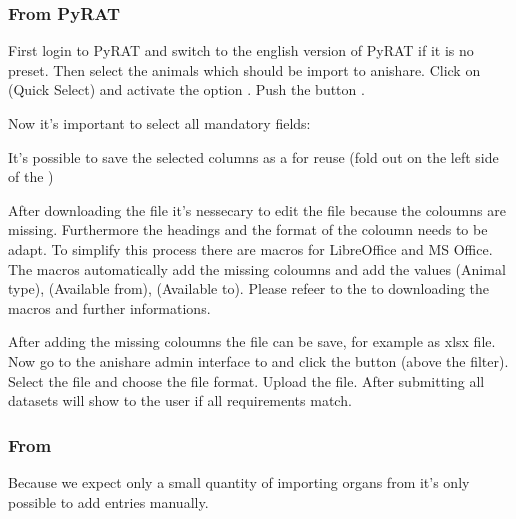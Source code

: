 \documentclass[letterpaper,10pt,openany,oneside,english]{sphinxmanual}
\begin{document}
\subsubsection{From PyRAT}
\label{\detokenize{index:id2}}
First login to PyRAT and switch to the english version of PyRAT if it is no preset. Then select the animals which
should be import to anishare. Click on  (Quick Select) and activate the option .
Push the button .

Now it’s important to select all mandatory fields:

\noindent{}

It’s possible to save the selected columns as a  for reuse (fold out  on the left side of the )

After downloading the file it’s nessecary to edit the file because the coloumns  are missing.
Furthermore the headings and the format of the coloumn  needs to be adapt.
To simplify this process there are macros for LibreOffice and MS Office. The macros automatically add the missing coloumns and add the values
 (Animal type),  (Available from),  (Available to).
Please refeer to the  to downloading the macros and further informations.

After adding the missing coloumns the file can be save, for example as xlsx file. Now go to the anishare admin interface to 
and click the button  (above the filter). Select the file and choose the file format. Upload the file. After submitting all datasets will show to
the user if all requirements match.


\subsubsection{From }
\label{\detokenize{index:id4}}
Because we expect only a small quantity of importing organs from  it’s only possible to add entries manually.
\end{document}
